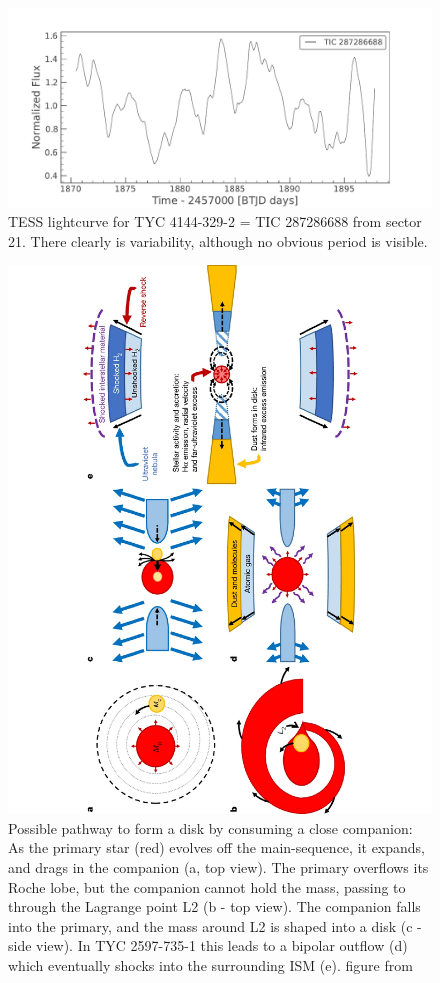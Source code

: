 \documentclass[letterpaper,11pt]{article}
\begin{document}
\begin{figure}
\includegraphics[width=.7\textwidth]{TESSlc}
\caption{TESS lightcurve for TYC 4144-329-2 = TIC 287286688 from sector 21. There clearly is variability, although no obvious period is visible.}
\label{fig:TESS}
\end{figure}


\begin{figure}[htbp]
\begin{center}
\includegraphics[angle=-90,width=.7\textwidth]{nature_sketch}
\caption{Possible pathway to form a disk by consuming a close companion: As the primary star (red) evolves off the main-sequence, it expands, and drags in the companion (a, top view). The primary overflows its Roche lobe, but the companion cannot hold the mass, passing to through the Lagrange point L2 (b - top view). The companion falls into the primary, and the mass around L2 is shaped into a disk (c - side view). In TYC 2597-735-1 this leads to a bipolar outflow (d) which eventually shocks into the surrounding ISM (e). figure from \cite{2020Natur.587..387H}}
\label{fig:naturesketch}
\end{center}
\end{figure}
\end{document}
